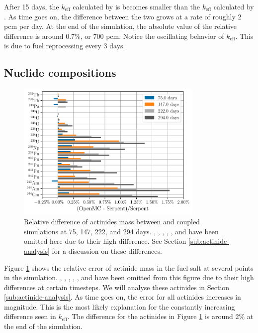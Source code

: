 After 15 days, the $k_\text{eff}$ calculated by \OpenMC is becomes smaller than
the $k_\text{eff}$ calculated by \SerpentTWO. As time goes on, the difference
between the two grows at a rate of roughly 2 pcm per day. At the end of the simulation, the absolute
value of the relative difference is around 0.7\%, or 700 pcm. Notice the
oscillating behavior of $k_\text{eff}$. This is due to fuel reprocessing every 3 days.


\subsection{Nuclide compositions}
\label{sub:nuclide-compositions}

\begin{figure}[htpb]
    \centering
    \includegraphics[width=0.8\textwidth]{figs/ch5/actinides.pdf}
    \caption[Relative difference of actinides mass in fuel at selected time steps]{Relative difference of actinides mass between \OpenMC and \SerpentTWO
    coupled simulations at 75, 147, 222, and 294 days. , ,
    , ,
    , and  have been omitted here due to their high difference.
    See Section \ref{sub:actinide-analysis} for a discussion on these differences.}
    \label{fig:actinides}
\end{figure}

Figure \ref{fig:actinides} shows the relative error of actinide mass in the fuel
salt at several points in the simulation. , ,
, , , and  have been omitted
from this figure due to their high differences at certain timesteps. We will analyse these
actinides in Section \ref{sub:actinide-analysis}. As time goes on, the error for
all actinides increases in magnitude. This is the most likely explanation for the constantly
increasing difference seen in $k_\text{eff}$. The difference for the actinides in
Figure \ref{fig:actinides} is around 2\% at the end of the simulation.

